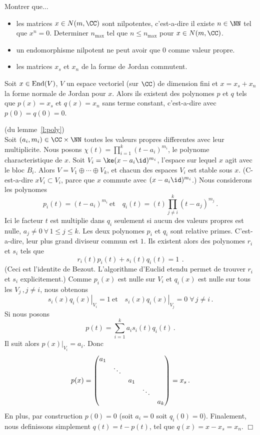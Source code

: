 \begin{eee} Montrer que... 
\begin{itemize} 
\item  les  matrices   $x\in N(m,\CC)$ sont nilpotentes, c'est-a-dire il existe $n\in \NN$ tel que $x^n=0$.
Determiner $n_{\max}$ tel que $n\le n_{\max}$ pour $x\in N(m,\CC)$.
\item un endomorphisme  nilpotent ne peut avoir que $0$ comme valeur propre.
\item les matrices $x_s$ et $x_n$ de la forme de Jordan commutent.
\end{itemize}
\end{eee}

\begin{lem}\label{l:poly} Soit $x\in {\rm End}(V)$, $V$ un espace vectoriel (sur $\CC$) de dimension fini et 
$x=x_s+x_n$ la forme normale de Jordan pour $x$. Alors ils existent des polynomes $p$ et $q$ tels que
$p(x) = x_s$ et $q(x) = x_n$ sans terme constant, c'est-a-dire avec $p(0)=q(0)=0$. 
\end{lem}
\begin{prv} (du lemme~\ref{l:poly})\\
Soit $(a_i,m_i) \in \CC\times \NN$ toutes les valeurs propres differentes avec leur multiplicite. Nous posons
$\chi(t) = \prod_{i=1}^k(t-a_i)^{m_i}$, le polynome characteristique de $x$. Soit $V_i = \ke(x-a_i\id)^{m_i}$, 
l'espace sur lequel $x$ agit avec le bloc $B_i$. Alors
$ V = V_1\oplus \cdots \oplus V_k$, et chacun des espaces $V_i$ est stable sous $x$. 
(C-est-a-dire $xV_i\subset V_i$, parce que $x$ commute avec $(x-a_i\id)^{m_i}$.) 
Nous considerons les polynomes
$$ p_i(t) = (t-a_i)^{m_i} ~ \mbox{et}\quad q_i(t) = (t)\prod_{j\neq i}^k(t-a_j)^{m_j} \,.$$
Ici le facteur $t$ est multiplie dans $q_i$ seulement si aucun des valeurs propres est nulle, 
$a_j\neq 0~\forall \, 1\le j\le k$. Les deux polynomes $p_i$ et $q_i$ sont relative primes. C'est-a-dire,
leur plus grand diviseur commun est $1$. Ils existent alors des polynomes $r_i$ et $s_i$ tels que
$$  r_i(t)p_i(t) + s_i(t)q_i(t) =1~\,. $$
(Ceci est l'identite de Bezout. L'algorithme d'Euclid etendu permet de trouver $r_i$ et $s_i$ explicitement.)
Comme $p_i(x)$ est nulle sur $V_i$ et $q_i(x)$ est nulle sur tous les $V_j\, , j\neq i$, nous obtenons
$$   \left. s_i(x)q_i(x)\right|_{V_i} = 1  ~ \mbox{et}\quad \left. s_i(x)q_i(x)\right|_{V_j} = 0 \; \forall\, j\neq i \,. $$
Si nous posons
$$ p(t) = \sum_{i=1}^k a_is_i(t)q_i(t) \,. $$
Il suit alors $\left. p(x)\right|_{V_i}=a_i$. Donc
$$  p(x)  = \left(\begin{matrix}  a_1 & &  & & \cr  & \ddots & & & \cr & & a_1 & &  \cr & &  & \ddots& \cr & &  & & a_k
                  \end{matrix}\right) =x_s \,.
 $$
En plus, par construction $p(0)=0$ (soit $a_i=0$ soit $q_i(0)=0$). Finalement,
nous definissons simplement $q(t) = t-p(t)$, tel que $q(x) = x-x_s = x_n$. \hfill $\Box$                  
\end{prv}
